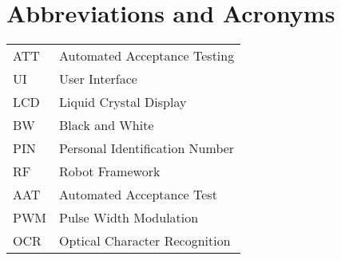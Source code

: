 
\chapter*{Abbreviations and Acronyms}


\noindent
\begin{longtable}{@{}p{}p{}@{}}
ATT & Automated Acceptance Testing \\
UI & User Interface \\
LCD & Liquid Crystal Display \\
BW & Black and White \\
PIN & Personal Identification Number \\
RF & Robot Framework \\
AAT & Automated Acceptance Test \\
PWM & Pulse Width Modulation \\
OCR & Optical Character Recognition \\

\end{longtable}
